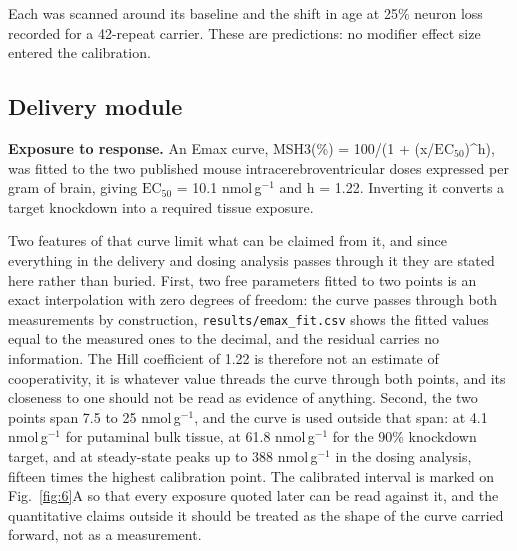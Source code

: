 \documentclass[conference]{IEEEtran}
\begin{document}
Each was scanned around its baseline and the shift in age at 25\% neuron loss recorded for a 42-repeat carrier. These are predictions: no modifier effect size entered the calibration.

\subsection{Delivery module}
\label{sec:2.9}
\textbf{Exposure to response.} An Emax curve, MSH3(\%) = 100/(1 + (x/$\mathrm{EC}_{50}$)\textasciicircum{}h), was fitted to the two published mouse intracerebroventricular doses expressed per gram of brain, giving $\mathrm{EC}_{50}$ = 10.1 nmol\,g$^{-1}$ and h = 1.22. Inverting it converts a target knockdown into a required tissue exposure.

Two features of that curve limit what can be claimed from it, and since everything in the delivery and dosing analysis passes through it they are stated here rather than buried. First, two free parameters fitted to two points is an exact interpolation with zero degrees of freedom: the curve passes through both measurements by construction, \texttt{results/\allowbreak{}emax\_\allowbreak{}fit.\allowbreak{}csv} shows the fitted values equal to the measured ones to the decimal, and the residual carries no information. The Hill coefficient of 1.22 is therefore not an estimate of cooperativity, it is whatever value threads the curve through both points, and its closeness to one should not be read as evidence of anything. Second, the two points span 7.5 to 25 nmol\,g$^{-1}$, and the curve is used outside that span: at 4.1 nmol\,g$^{-1}$ for putaminal bulk tissue, at 61.8 nmol\,g$^{-1}$ for the 90\% knockdown target, and at steady-state peaks up to 388 nmol\,g$^{-1}$ in the dosing analysis, fifteen times the highest calibration point. The calibrated interval is marked on Fig.~\ref{fig:6}A so that every exposure quoted later can be read against it, and the quantitative claims outside it should be treated as the shape of the curve carried forward, not as a measurement.
\end{document}
